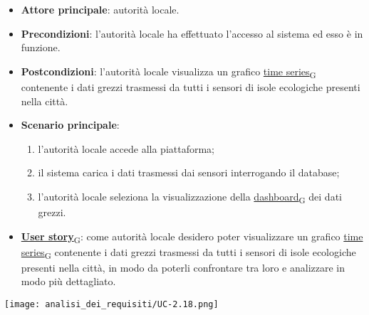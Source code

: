 \begin{itemize}
	\item \textbf{Attore principale}: autorità locale.
	\item \textbf{Precondizioni}: l'autorità locale ha effettuato l'accesso al sistema ed esso è in funzione.
	\item \textbf{Postcondizioni}: l'autorità locale visualizza un grafico \href{https://7last.github.io/docs/rtb/documentazione-interna/glossario\#time-series}{time series\textsubscript{G}} contenente i dati grezzi trasmessi da tutti i sensori
	      di isole ecologiche presenti nella città.
	\item \textbf{Scenario principale}:
	      \begin{enumerate}
		      \item l'autorità locale accede alla piattaforma;
		      \item il sistema carica i dati trasmessi dai sensori interrogando il database;
		      \item l'autorità locale seleziona la visualizzazione della \href{https://7last.github.io/docs/rtb/documentazione-interna/glossario\#dashboard}{dashboard\textsubscript{G}} dei dati grezzi.
	      \end{enumerate}
	\item \href{https://7last.github.io/docs/rtb/documentazione-interna/glossario\#user-story}{\textbf{User story}\textsubscript{G}}:
	      come autorità locale desidero poter visualizzare un grafico \href{https://7last.github.io/docs/rtb/documentazione-interna/glossario\#time-series}{time series\textsubscript{G}} contenente i dati grezzi trasmessi da tutti i sensori
	      di isole ecologiche presenti nella città, in modo da poterli confrontare tra loro e analizzare in modo più dettagliato.
\end{itemize}
\begin{center}
	\texttt{[image: analisi\_dei\_requisiti/UC-2.18.png]}
\end{center}

\newpage

